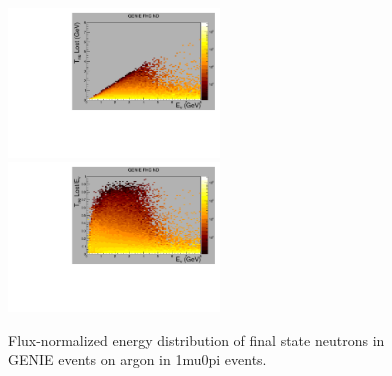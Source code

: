 \documentclass{article}
\begin{document}
\begin{figure}[!h]
  \includegraphics[width=0.5\textwidth]{plots.old/fig5.pdf}
  \includegraphics[width=0.5\textwidth]{plots.old/fig6.pdf}
  \caption{Flux-normalized energy distribution of final state neutrons in GENIE events on argon in 1mu0pi events.}
\end{figure}



\end{document}
